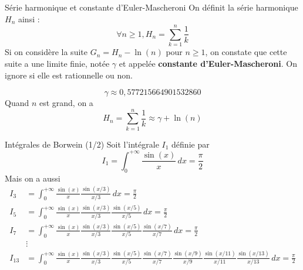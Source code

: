 \documentclass[aspectratio=1610,10pt,dvipsnames]{beamer}
\begin{document}
\begin{frame}{Série harmonique et constante d'Euler-Mascheroni}
On définit la série harmonique $H_n$ ainsi :
\begin{equation*}
   \forall n \ge 1,  H_n = \sum_{k=1}^{n} \frac{1}{k}
\end{equation*}
Si on considère la suite $G_n = H_n - \ln(n)$ pour $n \ge 1$, on constate que cette suite a une limite finie, notée
$\gamma$ et appelée \textbf{constante d'Euler-Mascheroni}. On ignore si elle est rationnelle ou non. 

\begin{equation*}
\gamma \approx 0,577215664901532860 
\end{equation*}
Quand $n$ est grand, on a 
\begin{equation*}
    H_n = \sum_{k=1}^{n} \frac{1}{k} \approx \gamma + \ln(n)
\end{equation*}

\end{frame}


\begin{frame}{Intégrales de Borwein (1/2)}
Soit l'intégrale $I_1$ définie par 
\begin{equation*}
I_1 = \int_{0}^{+\infty} \frac{\sin(x)}{x} \, dx = \frac{\pi}{2}
\end{equation*}
Mais on a aussi
\begin{equation*}
\begin{split}
I_3 &= \int_{0}^{+\infty} \frac{\sin(x)}{x} \frac{\sin(x/3)}{x/3} \, dx =
     \frac{\pi}{2}    \\
I_5 &= \int_{0}^{+\infty} \frac{\sin(x)}{x} \frac{\sin(x/3)}{x/3} 
  \frac{\sin(x/5)}{x/5} \, dx = \frac{\pi}{2}     \\     
I_7 &= \int_{0}^{+\infty} \frac{\sin(x)}{x} \frac{\sin(x/3)}{x/3} 
  \frac{\sin(x/5)}{x/5} \frac{\sin(x/7)}{x/7} \, dx = \frac{\pi}{2}    \\
  &\vdots \\
 I_{13} &= \int_{0}^{+\infty} \frac{\sin(x)}{x} \frac{\sin(x/3)}{x/3} 
  \frac{\sin(x/5)}{x/5} \frac{\sin(x/7)}{x/7} \frac{\sin(x/9)}{x/9}
  \frac{\sin(x/11)}{x/11} \frac{\sin(x/13)}{x/13} \, dx = \frac{\pi}{2}    \\
\end{split}
\end{equation*}
\end{frame}
\end{document}
